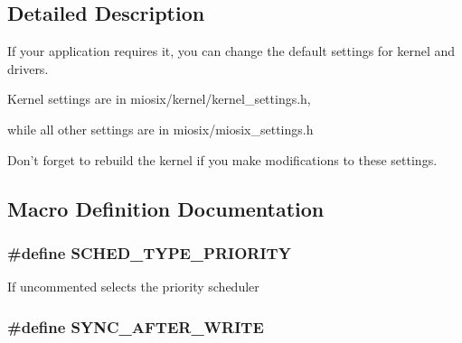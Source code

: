 \subsection{Detailed Description}
If your application requires it, you can change the default settings for kernel and drivers.

Kernel settings are in miosix/kernel/kernel\-\_\-settings.\-h,\par
 while all other settings are in miosix/miosix\-\_\-settings.\-h\par


Don't forget to rebuild the kernel if you make modifications to these settings. 

\subsection{Macro Definition Documentation}
\hypertarget{group___settings_ga2acdc2f0df96cf6cbc35f7fd78ddb70d}{
\subsubsection[{S\-C\-H\-E\-D\-\_\-\-T\-Y\-P\-E\-\_\-\-P\-R\-I\-O\-R\-I\-T\-Y}]{\setlength{\rightskip}{0pt plus 5cm}\#define S\-C\-H\-E\-D\-\_\-\-T\-Y\-P\-E\-\_\-\-P\-R\-I\-O\-R\-I\-T\-Y}}\label{group___settings_ga2acdc2f0df96cf6cbc35f7fd78ddb70d}
If uncommented selects the priority scheduler \hypertarget{group___settings_ga7f95cdeac372c6633422b100d6b15bba}{
\subsubsection[{S\-Y\-N\-C\-\_\-\-A\-F\-T\-E\-R\-\_\-\-W\-R\-I\-T\-E}]{\setlength{\rightskip}{0pt plus 5cm}\#define S\-Y\-N\-C\-\_\-\-A\-F\-T\-E\-R\-\_\-\-W\-R\-I\-T\-E}}\label{group___settings_ga7f95cdeac372c6633422b100d6b15bba}
